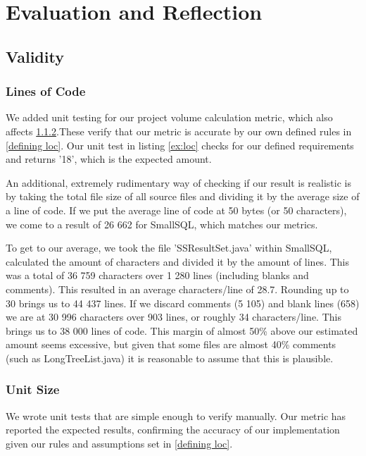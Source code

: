 \documentclass{article}
\begin{document}
\section{Evaluation and Reflection}

\subsection{Validity}

\subsubsection{Lines of Code} \label{validloc}
We added unit testing for our project volume calculation metric, which also affects \ref{validunitsize}.These verify that our metric is accurate by our own defined rules in \ref{defining loc}. 
Our unit test in listing \ref{ex:loc} checks for our defined requirements and returns '18', which is the expected amount.

An additional, extremely rudimentary way of checking if our result is realistic is by taking the total file size of all source files and dividing it by the average size of a line of code. If we put the average line of code at 50 bytes (or 50 characters), we come to a result of 26 662 for SmallSQL, which matches our metrics.

To get to our average, we took the file 'SSResultSet.java' within SmallSQL, calculated the amount of characters and divided it by the amount of lines. This was a total of 36 759 characters over 1 280 lines (including blanks and comments). This resulted in an average characters/line of 28.7. Rounding up to 30 brings us to 44 437 lines. If we discard comments (5 105) and blank lines (658) we are at 30 996 characters over 903 lines, or roughly 34 characters/line. This brings us to 38 000 lines of code. This margin of almost 50\% above our estimated amount seems excessive, but given that some files are almost 40\% comments (such as LongTreeList.java) it is reasonable to assume that this is plausible.

\subsubsection{Unit Size} \label{validunitsize}
We wrote unit tests that are simple enough to verify manually. Our metric has reported the expected results, confirming the accuracy of our implementation given our rules and assumptions set in \ref{defining loc}.
\end{document}
